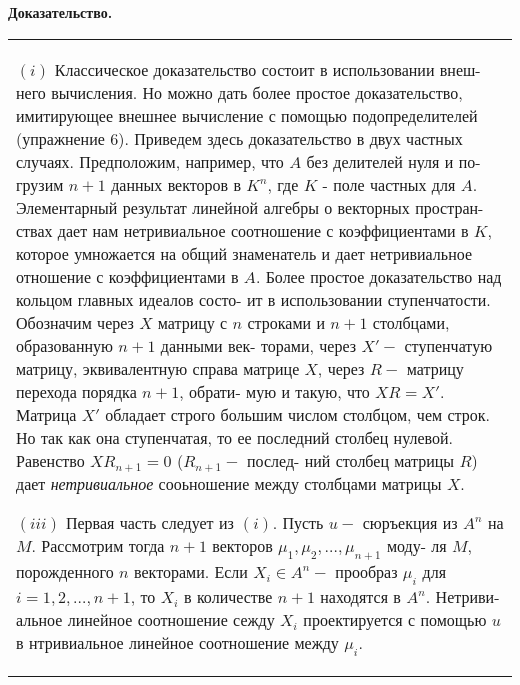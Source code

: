 \documentclass{mai_book}
\begin{document}
	\noindent
	{\bf Доказательство.}\newline
	\begin{tabular}{|p{13cm}}
	$(i)$ Классическое доказательство состоит в использовании внеш-\linebreak
	него вычисления. Но можно дать более простое доказательство,\linebreak
	имитирующее внешнее вычисление с помощью подопределителей\linebreak
	(упражнение 6). Приведем здесь доказательство в двух частных\linebreak
	случаях. Предположим, например, что $A$ без делителей нуля и по-\linebreak
	грузим $n + 1$ данных векторов в $K^n$, где $K$ - поле частных для $A$.\linebreak
	Элементарный результат линейной алгебры о векторных простран-\linebreak
	ствах дает нам нетривиальное соотношение с коэффициентами в $K$,\linebreak
	которое умножается на общий знаменатель и дает нетривиальное\linebreak
	отношение с коэффициентами в $A$.\newline
	Более простое доказательство над кольцом главных идеалов состо-\linebreak
	ит в использовании ступенчатости. Обозначим через $X$ матрицу с\linebreak
	$n$ строками и $n + 1$ столбцами, образованную $n + 1$ данными век-\linebreak
	торами, через $X' -$ ступенчатую матрицу, эквивалентную справа\linebreak
	матрице $X$, через $R -$ матрицу перехода порядка $n + 1$, обрати-\linebreak
	мую и такую, что $XR = X'$. Матрица $X'$ обладает строго большим\linebreak
	числом столбцом, чем строк. Но так как она ступенчатая, то ее\linebreak
	последний столбец нулевой. Равенство $XR_{n + 1} = 0$ ($R_{n + 1} -$ послед-\linebreak
	ний столбец матрицы $R$) дает {\it нетривиальное} сооьношение между\linebreak
	столбцами матрицы $X$.
	
	$(iii)$ Первая часть следует из $(i)$. Пусть $u -$ сюръекция из $A^n$\linebreak
	на $M$. Рассмотрим тогда $n + 1$ векторов $\mu_1, \mu_2, \ldots, \mu_{n + 1}$ моду-\linebreak
	ля $M$, порожденного $n$ векторами. Если $X_i \in A^n - $ прообраз $\mu_i$ для\linebreak
	$i = 1, 2, \ldots, n + 1$, то $X_i$ в количестве $n + 1$ находятся в $A^n$. Нетриви-\linebreak
	альное линейное соотношение сежду $X_i$ проектируется с помощью\linebreak
	$u$ в нтривиальное линейное соотношение между $\mu_i$.\linebreak
	

\end{tabular}
\end{document}

